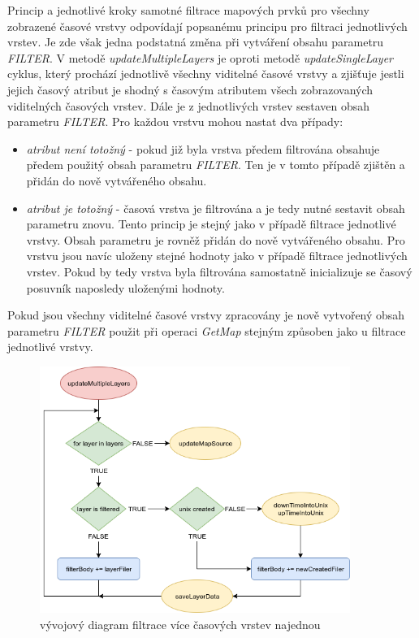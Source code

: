 Princip a jednotlivé kroky samotné filtrace mapových prvků pro všechny zobrazené časové vrstvy odpovídají popsanému principu pro filtraci jednotlivých vrstev. Je zde však jedna podstatná změna při vytváření obsahu parametru \textit{FILTER}. V metodě \textit{updateMultipleLayers} je oproti metodě \textit{updateSingleLayer} cyklus, který prochází jednotlivě všechny viditelné časové vrstvy a zjišťuje jestli jejich časový atribut je shodný s časovým atributem všech zobrazovaných viditelných časových vrstev. Dále je z jednotlivých vrstev sestaven obsah parametru \textit{FILTER}. Pro každou vrstvu mohou nastat dva případy:
	\begin{itemize}
		\item\textit{atribut není totožný} - pokud již byla vrstva předem filtrována obsahuje předem použitý obsah parametru \textit{FILTER}. Ten je v tomto případě zjištěn a přidán do nově vytvářeného obsahu.
		\item\textit{atribut je totožný} - časová vrstva je filtrována a je tedy nutné sestavit obsah parametru znovu. Tento princip je stejný jako v případě filtrace jednotlivé vrstvy. Obsah parametru je rovněž přidán do nově vytvářeného obsahu. Pro vrstvu jsou navíc uloženy stejné hodnoty jako v případě filtrace jednotlivých vrstev. Pokud by tedy vrstva byla filtrována samostatně inicializuje se časový posuvník naposledy uloženými hodnoty. 
	\end{itemize}
Pokud jsou všechny viditelné časové vrstvy zpracovány je nově vytvořený obsah parametru \textit{FILTER} použit při operaci \textit{GetMap} stejným způsoben jako u filtrace jednotlivé vrstvy.

\begin{figure}[h!]
	\centering
	\includegraphics[width=0.9\textwidth]{../img/getMultipleLayers.png}
	\caption{vývojový diagram filtrace více časových vrstev najednou}
	\label{fig:multiple-chart}
\end{figure}

